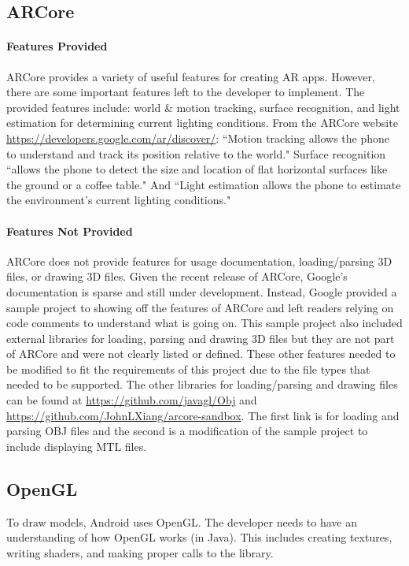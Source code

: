 \subsection{ARCore}
    \paragraph{Features Provided}

    ARCore provides a variety of useful features for creating AR apps. However, there are some important features left to the developer to implement. The provided features include: world \& motion tracking, surface recognition, and light estimation for determining current lighting conditions. From the ARCore website \url{https://developers.google.com/ar/discover/}: ``Motion tracking allows the phone to understand and track its position relative to the world." Surface recognition ``allows the phone to detect the size and location of flat horizontal surfaces like the ground or a coffee table." And ``Light estimation allows the phone to estimate the environment's current lighting conditions."

    \paragraph{Features Not Provided}

    ARCore does not provide features for usage documentation, loading/parsing 3D files, or drawing 3D files. Given the recent release of ARCore, Google's documentation is sparse and still under development. Instead, Google provided a sample project to showing off the features of ARCore and left readers relying on code comments to understand what is going on. This sample project also included external libraries for loading, parsing and drawing 3D files but they are not part of ARCore and were not clearly listed or defined. These other features needed to be modified to fit the requirements of this project due to the file types that needed to be supported. The other libraries for loading/parsing and drawing files can be found at \url{https://github.com/javagl/Obj} and \url{https://github.com/JohnLXiang/arcore-sandbox}. The first link is for loading and parsing OBJ files and the second is a modification of the sample project to include displaying MTL files.

\subsection{OpenGL}
    To draw models, Android uses OpenGL. The developer needs to have an understanding of how OpenGL works (in Java). This includes creating textures, writing shaders, and making proper calls to the library.

